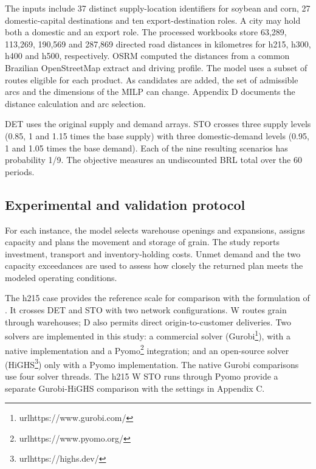 \documentclass[
  english,
  11pt,
  a4paper,
  authoryear,
  preprint]{elsarticle}
\begin{document}
The inputs include 37 distinct supply-location identifiers for soybean
and corn, 27 domestic-capital destinations and ten export-destination
roles. A city may hold both a domestic and an export role. The processed
workbooks store 63,289, 113,269, 190,569 and 287,869 directed road
distances in kilometres for h215, h300, h400 and h500, respectively.
OSRM computed the distances from a common Brazilian OpenStreetMap
extract and driving profile. The model uses a subset of routes eligible
for each product. As candidates are added, the set of admissible arcs
and the dimensions of the MILP can change. Appendix D documents the
distance calculation and arc selection.

DET uses the original supply and demand arrays. STO crosses three supply
levels (0.85, 1 and 1.15 times the base supply) with three
domestic-demand levels (0.95, 1 and 1.05 times the base demand). Each of
the nine resulting scenarios has probability 1/9. The objective measures
an undiscounted BRL total over the 60 periods.

\subsection{Experimental and validation
protocol}\label{experimental-and-validation-protocol}

For each instance, the model selects warehouse openings and expansions,
assigns capacity and plans the movement and storage of grain. The study reports
investment, transport and inventory-holding costs. Unmet demand and the two capacity exceedances are used to assess how closely the returned plan
meets the modeled operating conditions.

The h215 case provides the reference scale for comparison with the
formulation of \citet{rosa2026thesis}. It crosses DET and STO with two
network configurations. W routes grain through warehouses; D also
permits direct origin-to-customer deliveries. Two solvers are implemented in this study: a commercial solver (Gurobi\footnote{url{https://www.gurobi.com/}}), with a native implementation and a Pyomo\footnote{url{https://www.pyomo.org/}} integration; and an open-source solver (HiGHS\footnote{url{https://highs.dev/}}) only with a Pyomo implementation. The native Gurobi
comparisons use four solver threads. The h215 W STO runs through Pyomo provide a separate Gurobi-HiGHS comparison with the settings in Appendix C.
\end{document}
